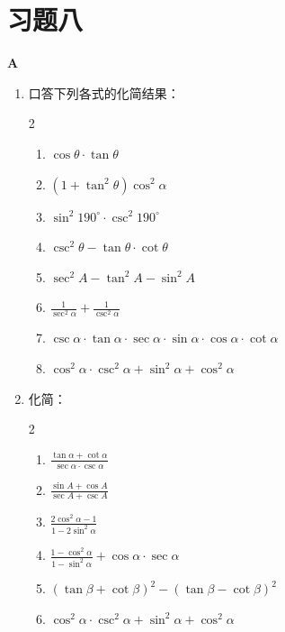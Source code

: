\section*{习题八}
\begin{center}
    \bfseries A
\end{center}

\begin{enumerate}
\item 口答下列各式的化简结果：
\begin{multicols}{2}
\begin{enumerate}[(1)]
    \item $\cos\theta\cdot \tan\theta$
    \item $(1+\tan^2\theta)\cos^2\alpha$
    \item $\sin^2 190^{\circ}\cdot \csc^2 190^{\circ}$
    \item $\csc^2\theta-\tan\theta\cdot \cot \theta$
    \item $\sec^2 A-\tan^2A-\sin^2A$
    \item $\frac{1}{\sec^2\alpha}+\frac{1}{\csc^2\alpha}$
    \item $\csc\alpha\cdot \tan\alpha\cdot \sec\alpha\cdot \sin\alpha\cdot \cos \alpha \cdot \cot \alpha$
    \item $\cos^2\alpha\cdot \csc^2\alpha+\sin^2\alpha+\cos^2\alpha$
\end{enumerate}
\end{multicols}

\item 化简：
\begin{multicols}{2}
\begin{enumerate}[(1)]
    \item $\frac{\tan\alpha+\cot\alpha}{\sec\alpha\cdot \csc\alpha}$
    \item $\frac{\sin A+\cos A}{\sec A+\csc A}$
    \item $\frac{2\cos^2 \alpha-1}{1-2\sin^2\alpha}$
    \item $\frac{1-\cos^2\alpha}{1-\sin^2\alpha}+\cos\alpha\cdot \sec\alpha$
    \item $(\tan\beta+\cot\beta)^2-(\tan\beta-\cot\beta)^2$
    \item $\cos^2\alpha\cdot \csc^2\alpha+\sin^2\alpha+\cos^2\alpha$
\end{enumerate}
\end{multicols}


\end{enumerate}

